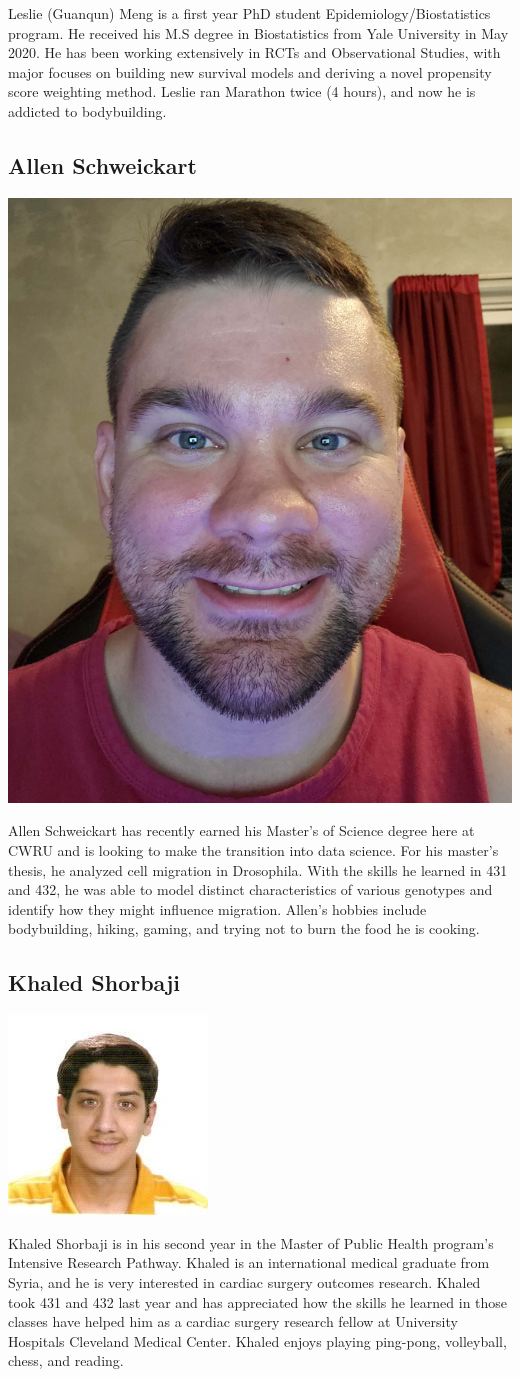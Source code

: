 \documentclass[
]{book}
\begin{document}
Leslie (Guanqun) Meng is a first year PhD student Epidemiology/Biostatistics program. He received his M.S degree in Biostatistics from Yale University in May 2020. He has been working extensively in RCTs and Observational Studies, with major focuses on building new survival models and deriving a novel propensity score weighting method. Leslie ran Marathon twice (4 hours), and now he is addicted to bodybuilding.

\hypertarget{allen-schweickart}{%
\subsection{Allen Schweickart}\label{allen-schweickart}}

\includegraphics[width=0.2\linewidth]{images/Allen_Schweickart}

Allen Schweickart has recently earned his Master's of Science degree here at CWRU and is looking to make the transition into data science. For his master's thesis, he analyzed cell migration in Drosophila. With the skills he learned in 431 and 432, he was able to model distinct characteristics of various genotypes and identify how they might influence migration. Allen's hobbies include bodybuilding, hiking, gaming, and trying not to burn the food he is cooking.

\hypertarget{khaled-shorbaji}{%
\subsection{Khaled Shorbaji}\label{khaled-shorbaji}}

\includegraphics[width=0.2\linewidth]{images/Khaled_Shorbaji}

Khaled Shorbaji is in his second year in the Master of Public Health program's Intensive Research Pathway. Khaled is an international medical graduate from Syria, and he is very interested in cardiac surgery outcomes research. Khaled took 431 and 432 last year and has appreciated how the skills he learned in those classes have helped him as a cardiac surgery research fellow at University Hospitals Cleveland Medical Center. Khaled enjoys playing ping-pong, volleyball, chess, and reading.
\end{document}
